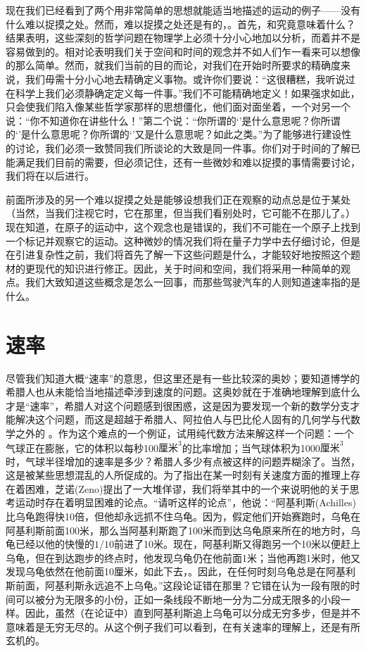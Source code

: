现在我们已经看到了两个用非常简单的思想就能适当地描述的运动的例子——没有什么难以捉摸之处。然而，难以捉摸之处还是有的，。首先，和究竟意味着什么？结果表明，这些深刻的哲学问题在物理学上必须十分小心地加以分析，而着并不是容易做到的。相对论表明我们关于空间和时间的观念并不如人们乍一看来可以想像的那么简单。然而，就我们当前的目的而论，对我们在开始时所要求的精确度来说，我们毋需十分小心地去精确定义事物。或许你们要说：“这很糟糕，我听说过在科学上我们必须静确定定义每一件事。”我们不可能精确地定义！如果强求如此，只会使我们陷入像某些哲学家那样的思想僵化，他们面对面坐着，一个对另一个说：“你不知道你在讲些什么！”第二个说：“你所谓的‘’是什么意思呢？你所谓的‘’是什么意思呢？你所谓的‘’又是什么意思呢？如此之类。”为了能够进行建设性的讨论，我们必须一致赞同我们所谈论的大致是同一件事。你们对于时间的了解已能满足我们目前的需要，但必须记住，还有一些微妙和难以捉摸的事情需要讨论，我们将在以后进行。

前面所涉及的另一个难以捉摸之处是能够设想我们正在观察的动点总是位于某处（当然，当我们注视它时，它在那里，但当我们看别处时，它可能不在那儿了。）现在知道，在原子的运动中，这个观念也是错误的，我们不可能在一个原子上找到一个标记并观察它的运动。这种微妙的情况我们将在量子力学中去仔细讨论，但是在引进复杂性之前，我们将首先了解一下这些问题是什么，才能较好地按照这个题材的更现代的知识进行修正。因此，关于时间和空间，我们将采用一种简单的观点。我们大致知道这些概念是怎么一回事，而那些驾驶汽车的人则知道速率指的是什么。

\section{速率}

尽管我们知道大概“速率”的意思，但这里还是有一些比较深的奥妙；要知道博学的希腊人也从未能恰当地描述牵涉到速度的问题。这奥妙就在于准确地理解到底什么才是“速率”，希腊人对这个问题感到很困惑，这是因为要发现一个新的数学分支才能解决这个问题，而这是超越于希腊人、阿拉伯人与巴比伦人固有的几何学与代数学之外的 。作为这个难点的一个例证，试用纯代数方法来解这样一个问题：一个气球正在膨胀，它的体积以每秒100$\text{厘米}^3$的比率增加；当气球体积为1000$\text{厘米}^3$时，气球半径增加的速率是多少？希腊人多少有点被这样的问题弄糊涂了。当然，这是被某些思想混乱的人所促成的。为了指出在某一时刻有关速度方面的推理上存在着困难，芝诺(Zeno)提出了一大堆佯谬，我们将举其中的一个来说明他的关于思考运动时存在着明显困难的论点。“请听这样的论点”，他说：“阿基利斯(Achilles)比乌龟跑得快10倍，但他却永远抓不住乌龟。因为，假定他们开始赛跑时，乌龟在阿基利斯前面100米，那么当阿基利斯跑了100米而到达乌龟原来所在的地方时，乌龟已经以他的快慢的$1/10$前进了10米。现在，阿基利斯又得跑另一个10米以便赶上乌龟，但在到达跑步的终点时，他发现乌龟仍在他前面1米；当他再跑1米时，他又发现乌龟依然在他前面10厘米，如此下去，。因此，在任何时刻乌龟总是在阿基利斯前面，阿基利斯永远追不上乌龟。”这段论证错在那里？它错在认为一段有限的时间可以被分为无限多的小份，正如一条线段不断地一分为二分成无限多的小段一样。因此，虽然（在论证中）直到阿基利斯追上乌龟可以分成无穷多步，但是并不意味着是无穷无尽的。从这个例子我们可以看到，在有关速率的理解上，还是有所玄机的。

